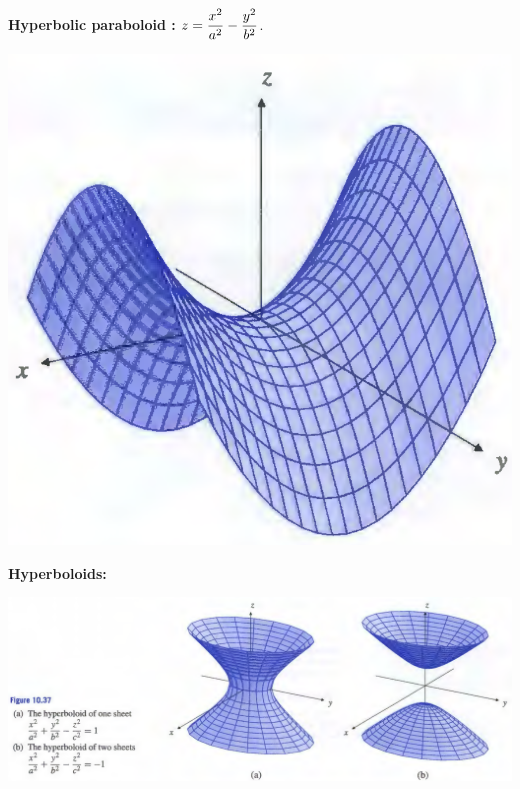 \documentclass[11pt, a4paper]{MATH2023}
\begin{document}
\begin{spacing}{1.3}
    {\bf Hyperbolic paraboloid :} $\displaystyle z=\frac{x^2}{a^2}-\frac{y^2}{b^2}$.

    \begin{center}
        \includegraphics[scale=0.3]{images/Ch10-hyperbolic-paraboloid.png}
    \end{center}

    {\bf Hyperboloids:}
    \begin{center}
        \includegraphics[scale=0.37]{images/Ch10-hyperboloid.png}
    \end{center}

\end{spacing}
\end{document}
